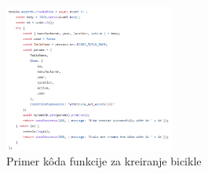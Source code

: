 \documentclass[12pt,oneside]{memoir}
\begin{document}
\begin{figure}[!ht]
  \centering
  \includegraphics[width=0.5\textwidth]{createBikeFunc.png}
  \caption{Primer kôda funkcije za kreiranje bicikle}
  \label{fig:createBikeFunc}
\end{figure}

\end{document}
